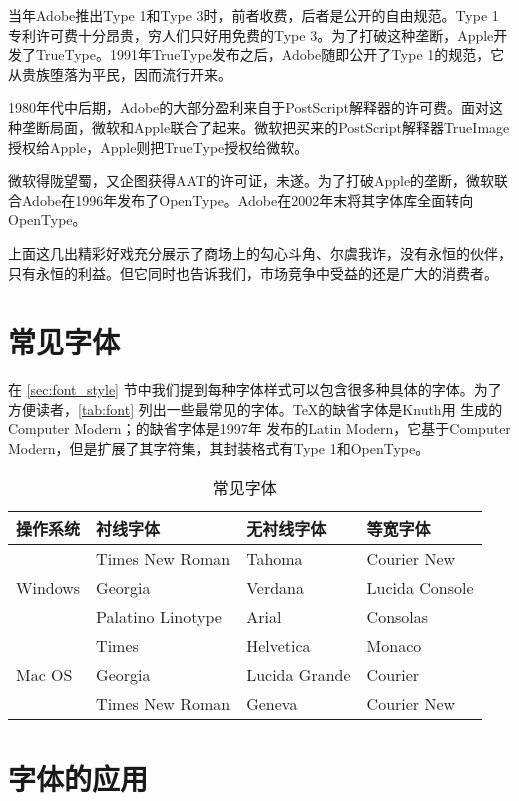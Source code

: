 当年Adobe推出Type 1和Type 3时，前者收费，后者是公开的自由规范。Type 1专利许可费十分昂贵，穷人们只好用免费的Type 3。为了打破这种垄断，Apple开发了TrueType。1991年TrueType发布之后，Adobe随即公开了Type 1的规范，它从贵族堕落为平民，因而流行开来。

1980年代中后期，Adobe的大部分盈利来自于PostScript解释器的许可费。面对这种垄断局面，微软和Apple联合了起来。微软把买来的PostScript解释器TrueImage授权给Apple，Apple则把TrueType授权给微软。

微软得陇望蜀，又企图获得AAT的许可证，未遂。为了打破Apple的垄断，微软联合Adobe在1996年发布了OpenType。Adobe在2002年末将其字体库全面转向OpenType。

上面这几出精彩好戏充分展示了商场上的勾心斗角、尔虞我诈，没有永恒的伙伴，只有永恒的利益。但它同时也告诉我们，市场竞争中受益的还是广大的消费者。

\section{常见字体}

在 \ref{sec:font_style} 节中我们提到每种字体样式可以包含很多种具体的字体。为了方便读者，\autoref{tab:font} 列出一些最常见的字体。\TeX 的缺省字体是Knuth用 \MF 生成的Computer Modern；\XeTeX 的缺省字体是1997年 \AmS 发布的Latin Modern，它基于Computer Modern，但是扩展了其字符集，其封装格式有Type 1和OpenType。

\begin{table}[htbp]
\caption{常见字体}
\label{tab:font}
\centering
\begin{tabular}{llll}
    \toprule
    操作系统 & 衬线字体        & 无衬线字体 & 等宽字体 \\
    \midrule
    \multirow{3}{*}{Windows}   
             & Times New Roman & Tahoma     & Courier New \\
             & Georgia         & Verdana    & Lucida Console \\
             & Palatino Linotype & Arial    & Consolas \\
    \midrule
    \multirow{3}{*}{Mac OS}   
             & Times           & Helvetica  & Monaco \\
             & Georgia         & Lucida Grande & Courier \\
             & Times New Roman & Geneva     & Courier New \\
    \bottomrule
\end{tabular}
\end{table}

\section{字体的应用}

